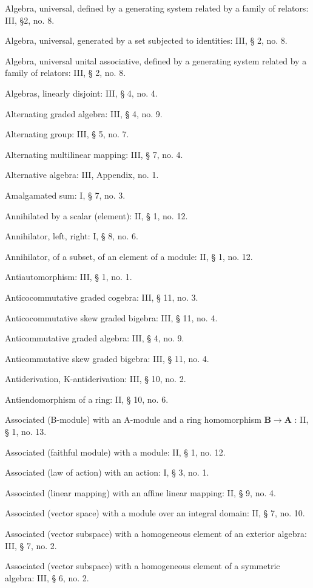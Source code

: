 Algebra, universal, defined by a generating system related by a family of relators: III, §2, no. 8.

Algebra, universal, generated by a set subjected to identities: III, § 2, no. 8.

Algebra, universal unital associative, defined by a generating system related by a family of relators: III, § 2, no. 8.

Algebras, linearly disjoint: III, § 4, no. 4.

Alternating graded algebra: III, § 4, no. 9.

Alternating group: III, § 5, no. 7.

Alternating multilinear mapping: III, § 7, no. 4.

Alternative algebra: III, Appendix, no. 1.

Amalgamated sum: I, § 7, no. 3.

Annihilated by a scalar (element): II, § 1, no. 12.

Annihilator, left, right: I, § 8, no. 6.

Annihilator, of a subset, of an element of a module: II, § 1, no. 12.

Antiautomorphism: III, § 1, no. 1.

Anticocommutative graded cogebra: III, § 11, no. 3.

Anticocommutative skew graded bigebra: III, § 11, no. 4.

Anticommutative graded algebra: III, § 4, no. 9.

Anticommutative skew graded bigebra: III, § 11, no. 4.

Antiderivation, K-antiderivation: III, § 10, no. 2.

Antiendomorphism of a ring: II, § 10, no. 6.

Associated (B-module) with an A-module and a ring homomorphism \(\mathbf{B} \to \mathbf{A}\) : II, § 1, no. 13.

Associated (faithful module) with a module: II, § 1, no. 12.

Associated (law of action) with an action: I, § 3, no. 1.

Associated (linear mapping) with an affine linear mapping: II, § 9, no. 4.

Associated (vector space) with a module over an integral domain: II, § 7, no. 10.

Associated (vector subspace) with a homogeneous element of an exterior algebra: III, § 7, no. 2.

Associated (vector subspace) with a homogeneous element of a symmetric algebra: III, § 6, no. 2.

